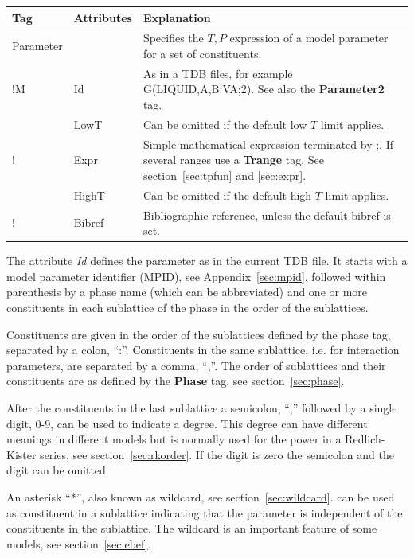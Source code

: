 \documentclass{article}
\begin{document}
\bigskip
\begin{tabular}{|p{} p{} p{}|}\hline
  Tag & Attributes & Explanation\\\hline

  Parameter & & Specifies the $T, P$ expression of a model parameter for a set of constituents.\\
!M      & Id & As in a TDB files, for example G(LIQUID,A,B:VA;2).  See also the {\bf Parameter2} tag. \\
      & LowT & Can be omitted if the default low $T$ limit applies.\\
!      & Expr & Simple mathematical expression terminated by ;.  If several ranges use a {\bf Trange} tag.  See section~\ref{sec:tpfun} and \ref{sec:expr}.\\
      & HighT & Can be omitted if the default high $T$ limit applies.\\
!      & Bibref & Bibliographic reference, unless the default bibref is set.\\\hline
\end{tabular}

The attribute {\em Id} defines the parameter as in the current TDB
file.  It starts with a model parameter identifier (MPID), see
Appendix~\ref{sec:mpid}, followed within parenthesis by a phase name
(which can be abbreviated) and one or more constituents in each
sublattice of the phase in the order of the sublattices.

Constituents are given in the order of the sublattices defined by the
phase tag, separated by a colon, ``:''.  Constituents in the same
sublattice, i.e.  for interaction parameters, are separated by a
comma, ``,''.  The order of sublattices and their constituents are as
defined by the {\bf Phase} tag, see section~\ref{sec:phase}.

After the constituents in the last sublattice a semicolon, ``;''
followed by a single digit, 0-9, can be used to indicate a degree.
This degree can have different meanings in different models but is
normally used for the power in a Redlich-Kister series, see
section~\ref{sec:rkorder}.  If the digit is zero the semicolon and the
digit can be omitted.

An asterisk ``*'', also known as wildcard, see
section~\ref{sec:wildcard}. can be used as constituent in a sublattice
indicating that the parameter is independent of the constituents in
the sublattice.  The wildcard is an important feature of some models,
see section~\ref{sec:ebef}.
\end{document}
